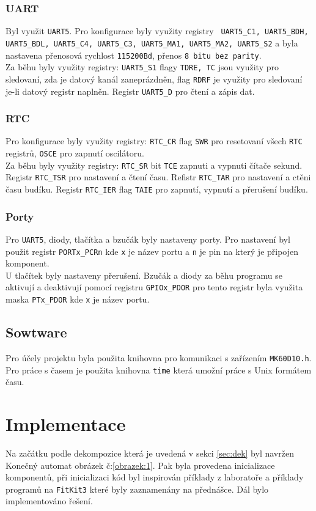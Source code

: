 \documentclass[a4paper,11pt]{article}
\begin{document}
\subsubsection{UART}
Byl využit \texttt{UART5}. Pro konfigurace byly využity registry \texttt{ UART5\_C1, UART5\_BDH, UART5\_BDL, UART5\_C4,  UART5\_C3,  UART5\_MA1,  UART5\_MA2, UART5\_S2} a byla nastavena  přenosová rychlost \texttt{115200Bd}, přenos \texttt{8 bitu bez parity}.\\
Za běhu byly využity registry: \texttt{UART5\_S1} flagy \texttt{TDRE, TC} jsou využity pro sledovaní, zda je datový kanál zaneprázdněn, flag \texttt{RDRF}
je využity pro sledovaní je-li datový registr naplněn. Registr \texttt{UART5\_D} pro čtení a zápis dat.
\subsubsection{RTC}
Pro konfigurace byly využity registry: \texttt{RTC\_CR} flag \texttt{SWR} pro 
resetovaní všech \texttt{RTC} registrů, \texttt{OSCE}  pro zapnutí oscilátoru. \\
Za běhu byly využity registry: \texttt{RTC\_SR} bit \texttt{TCE} zapnuti a vypnuti čítače sekund. Registr \texttt{RTC\_TSR} pro nastavení a čtení času. Refistr \texttt{RTC\_TAR} pro nastavení a ctěni času budíku. Registr \texttt{RTC\_IER} flag \texttt{TAIE} pro zapnutí, vypnutí a přerušení budíku. 
\subsubsection{Porty}
Pro \texttt{UART5}, diody, tlačítka a bzučák byly nastaveny porty. Pro nastavení byl použit registr \texttt{PORTx\_PCRn} kde \texttt{x} je název portu a \texttt{n} je pin na který je připojen komponent. \\
U tlačítek byly nastaveny přerušení. Bzučák a diody za běhu programu se aktivují a deaktivují pomocí registru \texttt{GPIOx\_PDOR} pro tento registr byla využita maska \texttt{PTx\_PDOR}  kde \texttt{x} je název portu.

\subsection{Sowtware}
Pro účely projektu byla použita knihovna pro komunikaci s zařízením \texttt{MK60D10.h}. Pro práce s časem je použita knihovna \texttt{time} která umožní práce s Unix formátem času.
\section{Implementace}
Na začátku podle dekompozice která je uvedená v sekci \ref{sec:dek} byl navržen Konečný automat obrázek č:\ref{obrazek:1}. Pak byla provedena inicializace komponentů, při inicializaci kód byl inspirován příklady z laboratoře a příklady programů na \texttt{FitKit3} které byly zaznamenány na přednášce. Dál bylo implementováno řešení.
\end{document}
